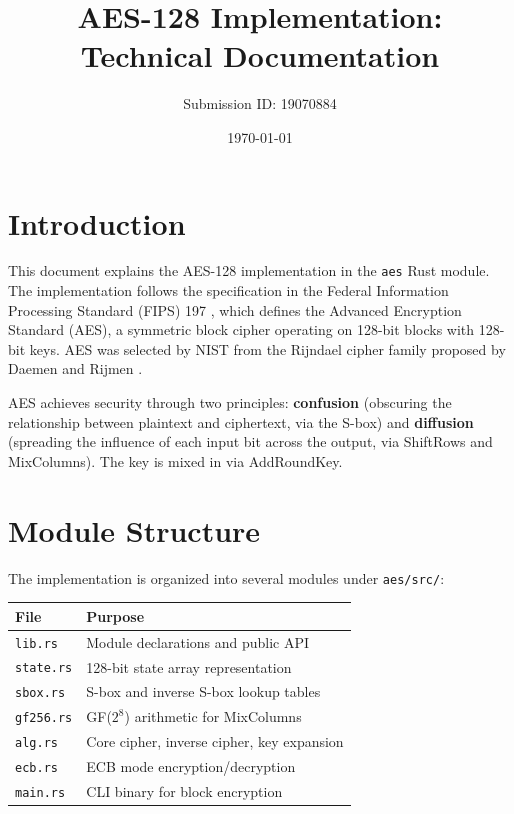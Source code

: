 \documentclass[11pt]{article}
\title{AES-128 Implementation: Technical Documentation}
\author{Submission ID: 19070884}
\date{\today}
\begin{document}
\maketitle

\section{Introduction}

This document explains the AES-128 implementation in the \texttt{aes} Rust module. The implementation follows the specification in the Federal Information Processing Standard (FIPS) 197 \cite{NIST2001}, which defines the Advanced Encryption Standard (AES), a symmetric block cipher operating on 128-bit blocks with 128-bit keys. AES was selected by NIST from the Rijndael cipher family proposed by Daemen and Rijmen \cite{NIST2001}.

AES achieves security through two principles: \textbf{confusion} (obscuring the relationship between plaintext and ciphertext, via the S-box) and \textbf{diffusion} (spreading the influence of each input bit across the output, via ShiftRows and MixColumns). The key is mixed in via AddRoundKey.

\section{Module Structure}

The implementation is organized into several modules under \texttt{aes/src/}:

\begin{center}
\begin{tabular}{ll}
\hline
\textbf{File} & \textbf{Purpose} \\
\hline
\texttt{lib.rs}      & Module declarations and public API \\
\texttt{state.rs}    & 128-bit state array representation \\
\texttt{sbox.rs}     & S-box and inverse S-box lookup tables \\
\texttt{gf256.rs}    & GF($2^8$) arithmetic for MixColumns \\
\texttt{alg.rs}      & Core cipher, inverse cipher, key expansion \\
\texttt{ecb.rs}      & ECB mode encryption/decryption \\
\texttt{main.rs}     & CLI binary for block encryption \\
\hline
\end{tabular}
\end{center}
\end{document}
